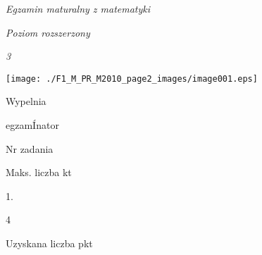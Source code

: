 \documentclass[a4paper,12pt]{article}
\begin{document}
{\it Egzamin maturalny z matematyki}

{\it Poziom rozszerzony}

{\it 3}
\begin{center}
\texttt{[image: ./F1\_M\_PR\_M2010\_page2\_images/image001.eps]}
\end{center}
Wypelnia

egzamÍnator

Nr zadania

Maks. liczba kt

1.

4

Uzyskana liczba pkt
\end{document}
